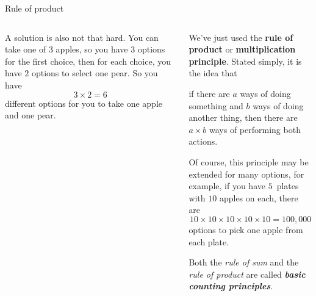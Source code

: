 \documentclass[9pt,aspectratio=169]{beamer}
\begin{document}
\begin{frame}{Rule of product}
\begin{columns}[T]
\begin{column}{0.5\textwidth}
      A solution is also not that hard. You can take one of $3$ apples, so you have $3$ options for the first choice, then for each choice, you have $2$ options to select one pear. So you have 
      \[3 \times 2 = 6\] 
      different options for you to take one apple and one pear.

    \end{column}
    \begin{column}{0.5\textwidth}
      We've just used the \textbf{rule of product} or \textbf{multiplication principle}. Stated simply, it is the idea that 
      \begin{definition}
        if there are $a$ ways of doing something and $b$ ways of doing another thing, then there are $a \times b$ ways of performing both actions.
      \end{definition}

      Of course, this principle may be extended for many options, for example, if you have $5$~plates with $10$ apples on each, there are
      \[ 10 \times 10 \times 10 \times 10 \times 10 = 100,000 \]
      options to pick one apple from each plate.

      \vspace*{1em}

      \begin{example}
        Both the \emph{rule of sum} and the \emph{rule of product} are called \emph{\textbf{basic counting principles}}.
      \end{example}
    \end{column}
  \end{columns}
\end{frame}
\end{document}
